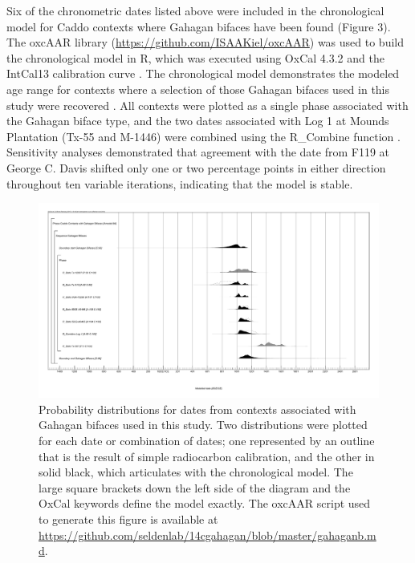 \documentclass[review]{elsarticle}
\begin{document}
Six of the chronometric dates listed above were included in the chronological model for Caddo contexts where Gahagan bifaces have been found (Figure 3). The oxcAAR library (\href{https://github.com/ISAAKiel/oxcAAR}{https://github.com/ISAAKiel/oxcAAR}) was used to build the chronological model in R, which was executed using OxCal 4.3.2 \citep{RN5514,RN20716} and the IntCal13 calibration curve \citep{RN4406}. The chronological model demonstrates the modeled age range for contexts where a selection of those Gahagan bifaces used in this study were recovered \citep{RN20850}. All contexts were plotted as a single phase associated with the Gahagan biface type, and the two dates associated with Log 1 at Mounds Plantation (Tx-55 and M-1446) were combined using the R\_Combine function \citep{RN20850}. Sensitivity analyses demonstrated that agreement with the date from F119 at George C. Davis shifted only one or two percentage points in either direction throughout ten variable iterations, indicating that the model is stable.

\begin{figure}[ht]\centering
\includegraphics[width=\linewidth]{fig03}
\caption{Probability distributions for dates from contexts associated with Gahagan bifaces used in this study. Two distributions were plotted for each date or combination of dates; one represented by an outline that is the result of simple radiocarbon calibration, and the other in solid black, which articulates with the chronological model. The large square brackets down the left side of the diagram and the OxCal keywords define the model exactly. The oxcAAR script used to generate this figure is available at \href{https://github.com/seldenlab/14cgahagan/blob/master/gahaganb.md}{https://github.com/seldenlab/14cgahagan/blob/master/gahaganb.md}.}
\label{fig:fig3}
\end{figure}
\end{document}
